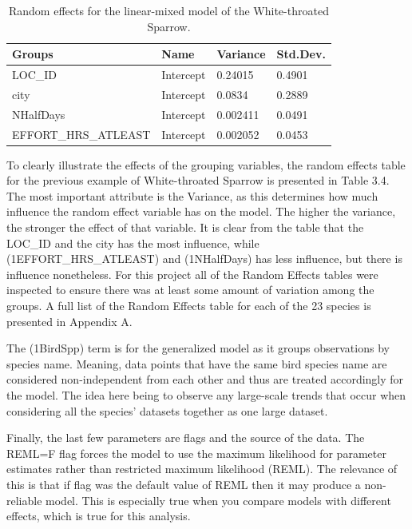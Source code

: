 \begin{longtable}[c]{|l|l|l|l|}
\caption{Random effects for the linear-mixed model of the White-throated Sparrow.}
\label{my-label}\\
\hline
Groups               & Name      & Variance & Std.Dev. \\ \hline
\endhead
%
LOC\_ID              & Intercept & 0.24015  & 0.4901  \\ \hline
city                 & Intercept & 0.0834  & 0.2889  \\ \hline
NHalfDays            & Intercept & 0.002411   & 0.0491  \\ \hline
EFFORT\_HRS\_ATLEAST & Intercept & 0.002052  & 0.0453  \\ \hline
\end{longtable}

To clearly illustrate the effects of the grouping variables, the random effects table for the previous example of White-throated Sparrow is presented in Table 3.4. The most important attribute is the Variance, as this determines how much influence the random effect variable has on the model. The higher the variance, the stronger the effect of that variable. It is clear from the table that the LOC\_ID and the city has the most influence, while (1\textbar EFFORT\_HRS\_ATLEAST) and (1\textbar NHalfDays) has less influence, but there is influence nonetheless. For this project all of the Random Effects tables were inspected to ensure there was at least some amount of variation among the groups. A full list of the Random Effects table for each of the 23 species is presented in Appendix A.


The (1\textbar BirdSpp) term is for the generalized model as it groups observations by species name. Meaning, data points that have the same bird species name are considered non-independent from each other and thus are treated accordingly for the model. The idea here being to observe any large-scale trends that occur when considering all the species' datasets together as one large dataset. 

Finally, the last few parameters are flags and the source of the data. The REML=F flag forces the model to use the maximum likelihood for parameter estimates rather than restricted maximum likelihood (REML). The relevance of this is that if flag was the default value of REML then it may produce a non-reliable model. This is especially true when you compare models with different effects, which is true for this analysis.

